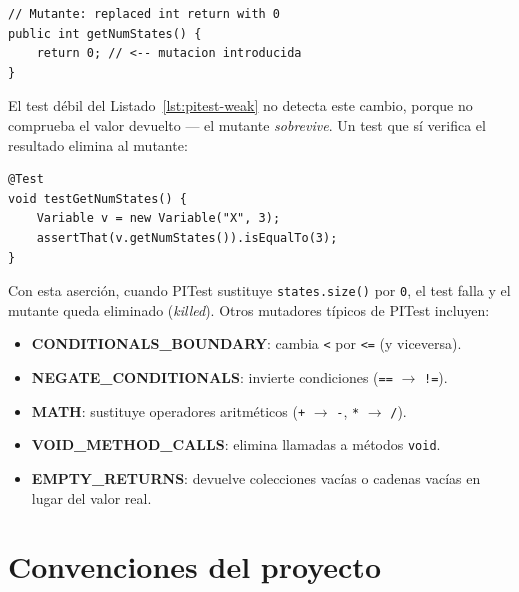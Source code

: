 \documentclass[12pt,a4paper]{article}
\begin{document}
\begin{lstlisting}[caption={Mutante generado: valor de retorno reemplazado por 0},
  label={lst:pitest-mutant}]
// Mutante: replaced int return with 0
public int getNumStates() {
    return 0; // <-- mutacion introducida
}
\end{lstlisting}

El test débil del Listado~\ref{lst:pitest-weak} no detecta este cambio,
porque no comprueba el valor devuelto --- el mutante \emph{sobrevive}.
Un test que sí verifica el resultado elimina al mutante:

\begin{lstlisting}[caption={Test robusto --- elimina el mutante},
  label={lst:pitest-strong}]
@Test
void testGetNumStates() {
    Variable v = new Variable("X", 3);
    assertThat(v.getNumStates()).isEqualTo(3);
}
\end{lstlisting}

Con esta aserción, cuando PITest sustituye \texttt{states.size()} por
\texttt{0}, el test falla y el mutante queda eliminado (\emph{killed}).
Otros mutadores típicos de PITest incluyen:

\begin{itemize}
  \item \textbf{CONDITIONALS\_BOUNDARY}: cambia \texttt{<} por \texttt{<=}
    (y viceversa).
  \item \textbf{NEGATE\_CONDITIONALS}: invierte condiciones
    (\texttt{==} $\to$ \texttt{!=}).
  \item \textbf{MATH}: sustituye operadores aritméticos
    (\texttt{+} $\to$ \texttt{-}, \texttt{*} $\to$ \texttt{/}).
  \item \textbf{VOID\_METHOD\_CALLS}: elimina llamadas a métodos
    \texttt{void}.
  \item \textbf{EMPTY\_RETURNS}: devuelve colecciones vacías o cadenas vacías
    en lugar del valor real.
\end{itemize}

\section{Convenciones del proyecto}
\label{sec:convenciones}
\end{document}

